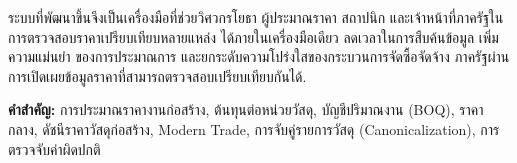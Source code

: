 ระบบที่พัฒนาขึ้นจึงเป็นเครื่องมือที่ช่วยวิศวกรโยธา ผู้ประมาณราคา
สถาปนิก และเจ้าหน้าที่ภาครัฐในการตรวจสอบราคาเปรียบเทียบหลายแหล่ง
ได้ภายในเครื่องมือเดียว ลดเวลาในการสืบค้นข้อมูล เพิ่มความแม่นยำ
ของการประมาณการ และยกระดับความโปร่งใสของกระบวนการจัดซื้อจัดจ้าง
ภาครัฐผ่านการเปิดเผยข้อมูลราคาที่สามารถตรวจสอบเปรียบเทียบกันได้.

\noindent\textbf{คำสำคัญ:} การประมาณราคางานก่อสร้าง,
ต้นทุนต่อหน่วยวัสดุ, บัญชีปริมาณงาน (BOQ), ราคากลาง,
ดัชนีราคาวัสดุก่อสร้าง, Modern Trade, การจับคู่รายการวัสดุ
(Canonicalization), การตรวจจับค่าผิดปกติ

\newpage
